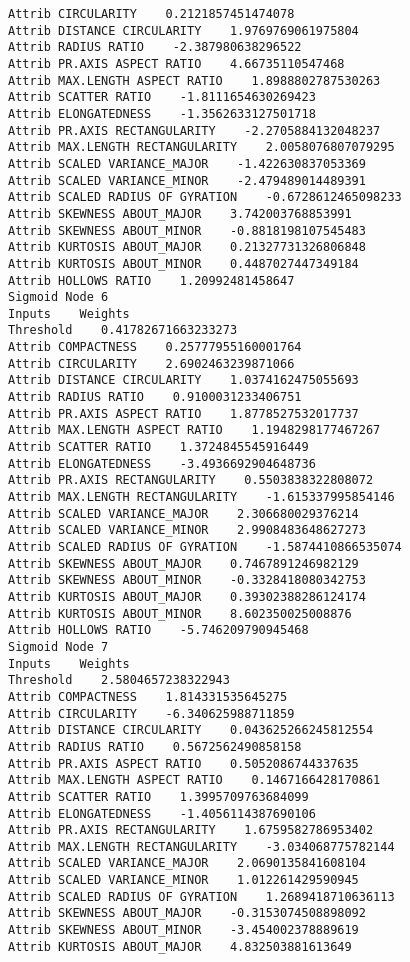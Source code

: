 \documentclass[
	article,			%
	11pt,				%
	oneside,			%
	a4paper,			%
	english,			%
	brazil,				%
	sumario=tradicional
	]{abntex2}
\begin{document}
\begin{lstlisting}
Attrib CIRCULARITY    0.2121857451474078
Attrib DISTANCE CIRCULARITY    1.9769769061975804
Attrib RADIUS RATIO    -2.387980638296522
Attrib PR.AXIS ASPECT RATIO    4.66735110547468
Attrib MAX.LENGTH ASPECT RATIO    1.8988802787530263
Attrib SCATTER RATIO    -1.8111654630269423
Attrib ELONGATEDNESS    -1.3562633127501718
Attrib PR.AXIS RECTANGULARITY    -2.2705884132048237
Attrib MAX.LENGTH RECTANGULARITY    2.0058076807079295
Attrib SCALED VARIANCE_MAJOR    -1.422630837053369
Attrib SCALED VARIANCE_MINOR    -2.479489014489391
Attrib SCALED RADIUS OF GYRATION    -0.6728612465098233
Attrib SKEWNESS ABOUT_MAJOR    3.742003768853991
Attrib SKEWNESS ABOUT_MINOR    -0.8818198107545483
Attrib KURTOSIS ABOUT_MAJOR    0.21327731326806848
Attrib KURTOSIS ABOUT_MINOR    0.4487027447349184
Attrib HOLLOWS RATIO    1.20992481458647
Sigmoid Node 6
Inputs    Weights
Threshold    0.41782671663233273
Attrib COMPACTNESS    0.25777955160001764
Attrib CIRCULARITY    2.6902463239871066
Attrib DISTANCE CIRCULARITY    1.0374162475055693
Attrib RADIUS RATIO    0.9100031233406751
Attrib PR.AXIS ASPECT RATIO    1.8778527532017737
Attrib MAX.LENGTH ASPECT RATIO    1.1948298177467267
Attrib SCATTER RATIO    1.3724845545916449
Attrib ELONGATEDNESS    -3.4936692904648736
Attrib PR.AXIS RECTANGULARITY    0.5503838322808072
Attrib MAX.LENGTH RECTANGULARITY    -1.615337995854146
Attrib SCALED VARIANCE_MAJOR    2.306680029376214
Attrib SCALED VARIANCE_MINOR    2.9908483648627273
Attrib SCALED RADIUS OF GYRATION    -1.5874410866535074
Attrib SKEWNESS ABOUT_MAJOR    0.7467891246982129
Attrib SKEWNESS ABOUT_MINOR    -0.3328418080342753
Attrib KURTOSIS ABOUT_MAJOR    0.39302388286124174
Attrib KURTOSIS ABOUT_MINOR    8.602350025008876
Attrib HOLLOWS RATIO    -5.746209790945468
Sigmoid Node 7
Inputs    Weights
Threshold    2.5804657238322943
Attrib COMPACTNESS    1.814331535645275
Attrib CIRCULARITY    -6.340625988711859
Attrib DISTANCE CIRCULARITY    0.043625266245812554
Attrib RADIUS RATIO    0.5672562490858158
Attrib PR.AXIS ASPECT RATIO    0.5052086744337635
Attrib MAX.LENGTH ASPECT RATIO    0.1467166428170861
Attrib SCATTER RATIO    1.3995709763684099
Attrib ELONGATEDNESS    -1.4056114387690106
Attrib PR.AXIS RECTANGULARITY    1.6759582786953402
Attrib MAX.LENGTH RECTANGULARITY    -3.034068775782144
Attrib SCALED VARIANCE_MAJOR    2.0690135841608104
Attrib SCALED VARIANCE_MINOR    1.012261429590945
Attrib SCALED RADIUS OF GYRATION    1.2689418710636113
Attrib SKEWNESS ABOUT_MAJOR    -0.3153074508898092
Attrib SKEWNESS ABOUT_MINOR    -3.454002378889619
Attrib KURTOSIS ABOUT_MAJOR    4.832503881613649

\end{lstlisting}
\end{document}
